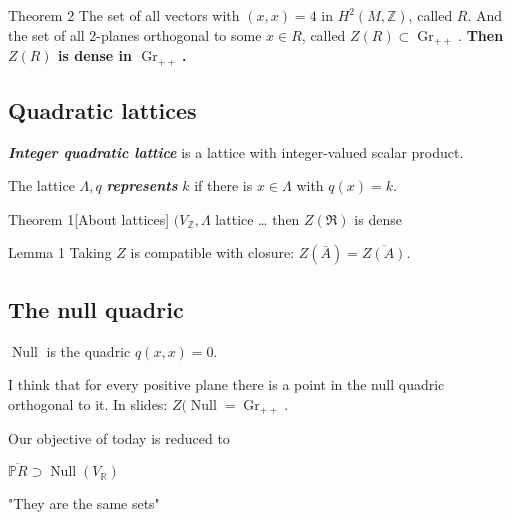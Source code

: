 \begin{thing5}{Theorem 2}\leavevmode
	The set of all vectors with $(x,x)=4$ in  $H^{2}(M,\mathbb{Z})$, called $R$. And the set of all 2-planes orthogonal to some $x\in R$, called $Z(R)\subset \operatorname{Gr}_{++}$. \textbf{Then $Z(R)$ is dense in  $\operatorname{Gr}_{++}$.} 
\end{thing5}

\subsection{Quadratic lattices}

\begin{defn}\leavevmode
	\textit{\textbf{Integer quadratic lattice}} is a lattice with integer-valued scalar product.

	The lattice  $\Lambda,q$ \textit{\textbf{represents}}  $k$ if there is $x\in\Lambda$ with $q(x)=k$.
\end{defn}

\begin{thing3}{Theorem 1}[About lattices]\leavevmode
	$(V_{\mathbb{Z}},\Lambda$ lattice … then $Z(\mathfrak{R})$ is dense
\end{thing3}

\begin{thing4}{Lemma 1}\leavevmode
	Taking $Z$ is compatible with closure: $Z(\bar{A})=\overline{Z(A)}$.
\end{thing4}

\subsection{The null quadric}
\begin{defn}\leavevmode
	$\operatorname{Null}$ is the quadric $q(x,x)=0$.
\end{defn}

\begin{remark}\leavevmode
	I think that for every positive plane there is a point in the null quadric orthogonal to it. In slides: $Z(\operatorname{Nu ll}=\operatorname{Gr}_{++}$.
\end{remark}

Our objective of today is reduced to

\begin{thm}[3]\leavevmode
	$\overline{\mathbb{P}R}\supset \operatorname{Nu ll}(V_{\mathbb{R}})$
\end{thm}

\begin{remark}\leavevmode
	"They are the same sets"
\end{remark}

